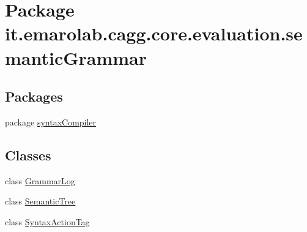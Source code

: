 \hypertarget{namespaceit_1_1emarolab_1_1cagg_1_1core_1_1evaluation_1_1semanticGrammar}{\section{Package it.\-emarolab.\-cagg.\-core.\-evaluation.\-semantic\-Grammar}
\label{namespaceit_1_1emarolab_1_1cagg_1_1core_1_1evaluation_1_1semanticGrammar}
}
\subsection*{Packages}
\begin{DoxyCompactItemize}
\item 
package \hyperlink{namespaceit_1_1emarolab_1_1cagg_1_1core_1_1evaluation_1_1semanticGrammar_1_1syntaxCompiler}{syntax\-Compiler}
\end{DoxyCompactItemize}
\subsection*{Classes}
\begin{DoxyCompactItemize}
\item 
class \hyperlink{classit_1_1emarolab_1_1cagg_1_1core_1_1evaluation_1_1semanticGrammar_1_1GrammarLog}{Grammar\-Log}
\item 
class \hyperlink{classit_1_1emarolab_1_1cagg_1_1core_1_1evaluation_1_1semanticGrammar_1_1SemanticTree}{Semantic\-Tree}
\item 
class \hyperlink{classit_1_1emarolab_1_1cagg_1_1core_1_1evaluation_1_1semanticGrammar_1_1SyntaxActionTag}{Syntax\-Action\-Tag}
\end{DoxyCompactItemize}
